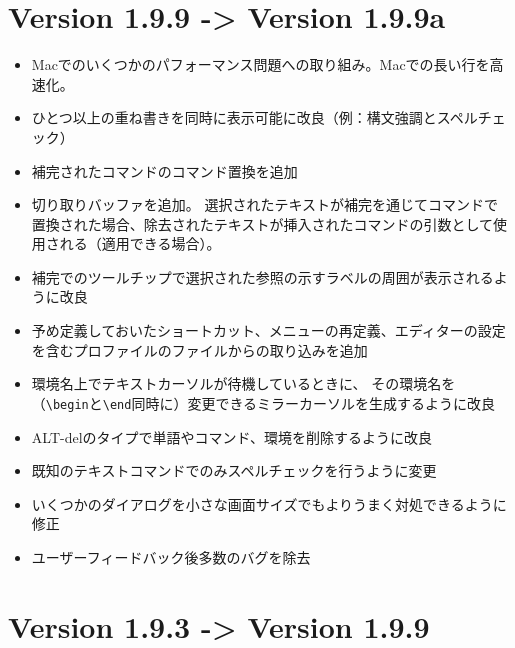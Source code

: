 \section{Version 1.9.9 -\textgreater{} Version 1.9.9a}

\begin{itemize}
\item
  Macでのいくつかのパフォーマンス問題への取り組み。Macでの長い行を高速化。
\item
  ひとつ以上の重ね書きを同時に表示可能に改良（例：構文強調とスペルチェック）
\item
  補完されたコマンドのコマンド置換を追加
\item
  切り取りバッファを追加。
  選択されたテキストが補完を通じてコマンドで置換された場合、除去されたテキストが挿入されたコマンドの引数として使用される（適用できる場合）。
\item
  補完でのツールチップで選択された参照の示すラベルの周囲が表示されるように改良
\item
  予め定義しておいたショートカット、メニューの再定義、エディターの設定を含むプロファイルのファイルからの取り込みを追加
\item
  環境名上でテキストカーソルが待機しているときに、
  その環境名を（\verb+\begin+と\verb+\end+同時に）変更できるミラーカーソルを生成するように改良
\item
  ALT-delのタイプで単語やコマンド、環境を削除するように改良
\item
  既知のテキストコマンドでのみスペルチェックを行うように変更
\item
  いくつかのダイアログを小さな画面サイズでもよりうまく対処できるように修正
\item
  ユーザーフィードバック後多数のバグを除去
\end{itemize}

\section{Version 1.9.3 -\textgreater{} Version 1.9.9}

